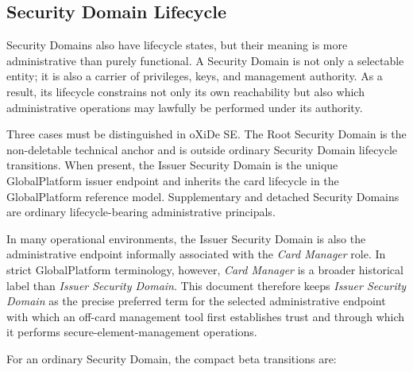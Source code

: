 \subsection{Security Domain Lifecycle}
\label{sec:gp-lifecycle-domain}


Security Domains also have lifecycle states, but their meaning is more
administrative than purely functional. A Security Domain is not only a
selectable entity; it is also a carrier of privileges, keys, and
management authority. As a result, its lifecycle constrains not only its
own reachability but also which administrative operations may lawfully be
performed under its authority.

Three cases must be distinguished in oXiDe SE. The Root Security Domain is the
non-deletable technical anchor and is outside ordinary Security Domain
lifecycle transitions. When present, the Issuer Security Domain is the unique
GlobalPlatform issuer endpoint and inherits the card lifecycle in the
GlobalPlatform reference model. Supplementary and detached Security Domains
are ordinary lifecycle-bearing administrative principals.

In many operational environments, the Issuer Security Domain is also the
administrative endpoint informally associated with the \emph{Card Manager}
role. In strict GlobalPlatform terminology, however, \emph{Card Manager} is a
broader historical label than \emph{Issuer Security Domain}. This document
therefore keeps \emph{Issuer Security Domain} as the precise preferred term for
the selected administrative endpoint with which an off-card management tool
first establishes trust and through which it performs secure-element-management
operations.

For an ordinary Security Domain, the compact beta transitions are:

